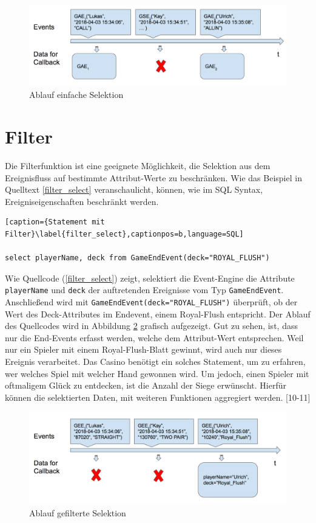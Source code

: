 \begin{figure}[h]
	\centering
	\includegraphics[width=\textwidth,height=\textheight, keepaspectratio]{images/statement_basic_select.png}
	\caption{Ablauf einfache Selektion}
	\label{basic_select_img}
\end{figure}

\section{Filter}

Die Filterfunktion ist eine geeignete Möglichkeit, die Selektion aus dem Ereignisfluss auf bestimmte Attribut-Werte zu beschränken. Wie das Beispiel in Quelltext \ref{filter_select} veranschaulicht, können, wie im SQL Syntax, Ereigniseigenschaften beschränkt werden.
\begin{lstlisting}[caption={Statement mit Filter}\label{filter_select},captionpos=b,language=SQL]

select playerName, deck from GameEndEvent(deck="ROYAL_FLUSH")

\end{lstlisting}
Wie Quellcode (\ref{filter_select}) zeigt, selektiert die Event-Engine die Attribute \texttt{playerName} und \texttt{deck} der auftretenden Ereignisse vom Typ \texttt{GameEndEvent}. Anschließend wird mit \texttt{GameEndEvent(deck="ROYAL\_FLUSH")} überprüft, ob der Wert des Deck-Attributes im Endevent, einem Royal-Flush entspricht.
Der Ablauf des Quellcodes wird in Abbildung \ref{filter_select_img} grafisch aufgezeigt. Gut zu sehen, ist, dass nur die End-Events erfasst werden, welche dem Attribut-Wert entsprechen. Weil nur ein Spieler mit einem Royal-Flush-Blatt gewinnt, wird auch nur dieses Ereignis verarbeitet.
Das Casino benötigt ein solches Statement, um zu erfahren, wer welches Spiel mit welcher Hand gewonnen wird. Um jedoch, einen Spieler mit oftmaligem Glück zu entdecken, ist die Anzahl der Siege erwünscht. Hierfür können die selektierten Daten, mit weiteren Funktionen aggregiert werden.
\cite{EsperRef2018}[10-11]
\begin{figure}[ht]
	\centering
	\includegraphics[width=\textwidth,height=\textheight, keepaspectratio]{images/statement_basic_filter.png}
	\caption{Ablauf gefilterte Selektion}
	\label{filter_select_img}
\end{figure}

